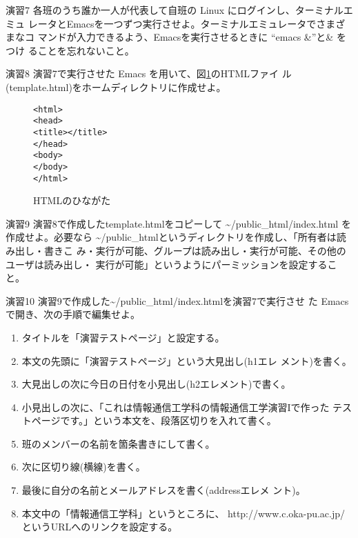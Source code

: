 \documentclass[a4j,10pt]{jarticle}
\begin{document}
\begin{itembox}{演習7}
 各班のうち誰か一人が代表して自班の Linux にログインし、ターミナルエミュ
 レータとEmacsを一つずつ実行させよ。ターミナルエミュレータでさまざまなコ
 マンドが入力できるよう、Emacsを実行させるときに ``emacs \&''と\& をつけ
 ることを忘れないこと。
\end{itembox}
\begin{itembox}{演習8}
 演習7で実行させた Emacs を用いて、図\ref{fig:template.html}のHTMLファイ
 ル(template.html)をホームディレクトリに作成せよ。
\end{itembox}
\begin{figure}[htbp]
 \begin{verbatim}
<html>
<head>
<title></title>
</head>
<body>
</body>
</html>
 \end{verbatim}
 \caption{HTMLのひながた}
 \label{fig:template.html}
\end{figure}
\begin{itembox}{演習9}
 演習8で作成したtemplate.htmlをコピーして {\sffamily
 \~{}/public\_html/index.html} を作成せよ。必要なら {\sffamily
 \~{}/public\_html}というディレクトリを作成し、「所有者は読み出し・書きこ
 み・実行が可能、グループは読み出し・実行が可能、その他のユーザは読み出し・
 実行が可能」というようにパーミッションを設定すること。
\end{itembox}
\begin{itembox}{演習10}
 演習9で作成した{\sffamily \~{}/public\_html/index.html}を演習7で実行させ
 た Emacs で開き、次の手順で編集せよ。
 \begin{enumerate}
  \item タイトルを「演習テストページ」と設定する。
  \item 本文の先頭に「演習テストページ」という大見出し({\sffamily h1}エレ
	メント)を書く。
  \item 大見出しの次に今日の日付を小見出し({\sffamily h2}エレメント)で書く。
  \item 小見出しの次に、「これは情報通信工学科の情報通信工学演習Iで作った
	テストページです。」という本文を、段落区切りを入れて書く。
  \item 班のメンバーの名前を箇条書きにして書く。
  \item 次に区切り線(横線)を書く。
  \item 最後に自分の名前とメールアドレスを書く({\sffamily address}エレメ
	ント)。
  \item 本文中の「情報通信工学科」というところに、{\sffamily
	http://www.c.oka-pu.ac.jp/}というURLへのリンクを設定する。
 \end{enumerate}
\end{itembox}
\end{document}
